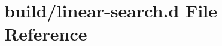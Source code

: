 \hypertarget{linear-search_8d}{}\section{build/linear-\/search.d File Reference}
\label{linear-search_8d}
